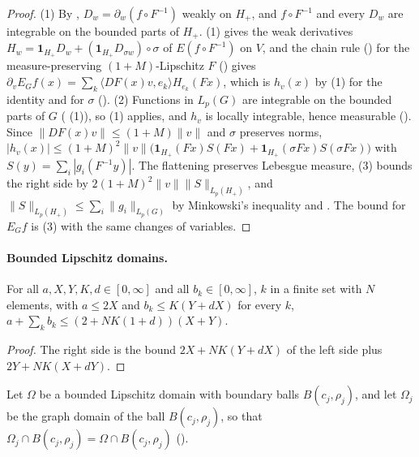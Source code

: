 \begin{proof}
\leanok
(1) By , $D_w = \partial_w (f \circ F^{-1})$ weakly on $H_+$, and
$f \circ F^{-1}$ and every $D_w$ are integrable on the bounded parts of $H_+$.
 (1) gives the weak derivatives
$H_w = \mathbf 1_{H_+} D_w + (\mathbf 1_{H_+} D_{\sigma w}) \circ \sigma$ of $E(f \circ F^{-1})$ on
$V$, and the chain rule () for the measure-preserving
$(1 + M)$-Lipschitz $F$ () gives
$\partial_v E_G f(x) = \sum_k \langle DF(x) v, e_k \rangle H_{e_k}(F x)$, which is $h_v(x)$ by
 (1) for the identity and for $\sigma$
(). (2) Functions in $L_p(G)$ are integrable on the bounded parts
of $G$ ( (1)), so (1) applies, and $h_v$ is locally integrable,
hence measurable (). Since
$\|DF(x) v\| \leq (1 + M) \|v\|$ and $\sigma$ preserves norms,
$|h_v(x)| \leq (1 + M)^2 \|v\| \bigl(\mathbf 1_{H_+}(F x) S(F x) + \mathbf 1_{H_+}(\sigma F x)
S(\sigma F x)\bigr)$ with $S(y) = \sum_i |g_i(F^{-1} y)|$. The flattening preserves Lebesgue
measure,  (3) bounds the right side by
$2 (1 + M)^2 \|v\| \|S\|_{L_p(H_+)}$, and $\|S\|_{L_p(H_+)} \leq \sum_i \|g_i\|_{L_p(G)}$ by
Minkowski's inequality and . The bound for $E_G f$ is
 (3) with the same changes of variables.
\end{proof}

\paragraph{Bounded Lipschitz domains.}

\begin{lemma}
\label{lem:sum-of-bounds}
\leanok
For all $a, X, Y, K, d \in [0, \infty]$ and all $b_k \in [0, \infty]$, $k$ in a finite set with
$N$ elements, with $a \leq 2 X$ and $b_k \leq K (Y + d X)$ for every $k$,
$a + \sum_k b_k \leq (2 + N K (1 + d)) (X + Y)$.
\end{lemma}

\begin{proof}
\leanok
The right side is the bound $2 X + N K (Y + d X)$ of the left side plus
$2 Y + N K (X + d Y)$.
\end{proof}

Let $\Omega$ be a bounded Lipschitz domain with boundary balls $B(c_j, \rho_j)$, and let
$\Omega_j$ be the graph domain of the ball $B(c_j, \rho_j)$, so that
$\Omega_j \cap B(c_j, \rho_j) = \Omega \cap B(c_j, \rho_j)$ ().

